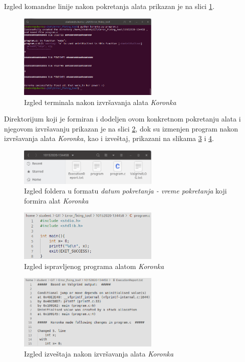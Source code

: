 \documentclass[12pt,oneside]{memoir}
\theoremstyle{plain}
\theoremstyle{definition}
\begin{document}
Izgled komandne linije nakon pokretanja alata prikazan je na slici \ref{fig:slika4.11}. 
\begin{figure}[!ht]
  \centering
  \includegraphics[width=0.6\textwidth]{TerminalOutput.png}
  \caption{Izgled terminala nakon izvršavanja alata \textit{Koronka}}
  \label{fig:slika4.11}
\end{figure}

Direktorijum koji je formiran i dodeljen ovom konkretnom pokretanju alata i njegovom izvršavanju prikazan je na slici \ref{fig:slika4.12}, dok su izmenjen program nakon izvršavanja alata \textit{Koronka}, kao i izveštaj, prikazani na slikama \ref{fig:slika4.13} i \ref{fig:slika4.14}.
\begin{figure}[!ht]
  \centering
  \includegraphics[width=0.6\textwidth]{DateTimeFolder.png}
  \caption{Izgled foldera u formatu \textit{datum pokretanja - vreme pokretanja} koji formira alat \textit{Koronka}}
  \label{fig:slika4.12}
\end{figure}

\begin{figure}[!ht]
  \centering
  \includegraphics[width=0.6\textwidth]{FixedProgram.png}
  \caption{Izgled ispravljenog programa alatom \textit{Koronka}}
  \label{fig:slika4.13}
\end{figure}

\begin{figure}[!ht]
  \centering
  \includegraphics[width=0.6\textwidth]{ExecutionReport.png}
  \caption{Izgled izveštaja nakon izvršavanja alata \textit{Koronka}}
  \label{fig:slika4.14}
\end{figure}
\end{document}
